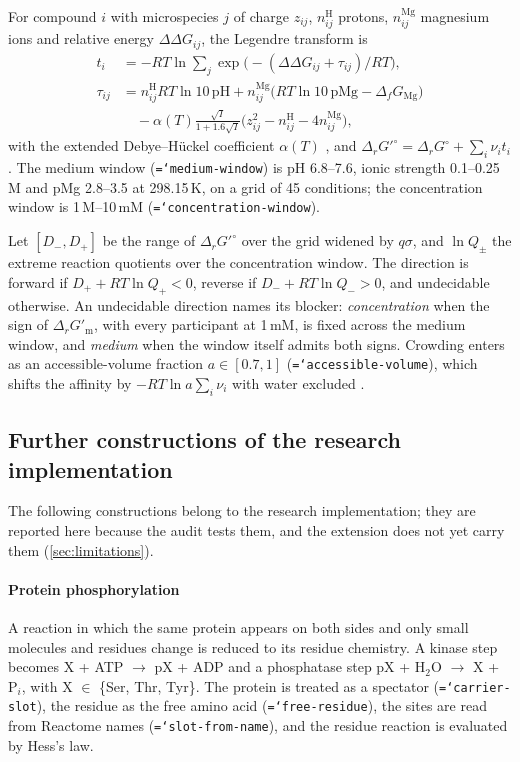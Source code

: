 \documentclass[5p]{elsarticle}
\theoremstyle{definition}
\theoremstyle{plain}
\newcommand{\DG}{\ensuremath{\Delta_r G^\circ}}
\newcommand{\DGp}{\ensuremath{\Delta_r G'^\circ}}
\newcommand{\DGm}{\ensuremath{\Delta_r G'_{\mathrm{m}}}}
\newcommand{\st}[1]{\textsf{#1}}            %
\newcommand{\breakingtt}[1]{\texttt{\hyphenchar\font=`\-\relax #1}}  %
\newcommand{\conv}[1]{\breakingtt{#1}}      %
\begin{document}
For compound $i$ with microspecies $j$ of charge $z_{ij}$, $n^{\mathrm H}_{ij}$ protons, $n^{\mathrm{Mg}}_{ij}$ magnesium ions and relative energy $\Delta\Delta G_{ij}$, the Legendre transform is
\begin{align}
  t_i&=-RT\ln\textstyle\sum_j\exp\bigl(-(\Delta\Delta G_{ij}+\tau_{ij})/RT\bigr),\\
  \tau_{ij}&=n^{\mathrm H}_{ij}RT\ln10\,\mathrm{pH}+n^{\mathrm{Mg}}_{ij}\bigl(RT\ln10\,\mathrm{pMg}-\Delta_fG_{\mathrm{Mg}}\bigr)\nonumber\\
  &\quad-\alpha(T)\tfrac{\sqrt I}{1+1.6\sqrt I}\bigl(z_{ij}^2-n^{\mathrm H}_{ij}-4n^{\mathrm{Mg}}_{ij}\bigr),
\end{align}
with the extended Debye--H\"uckel coefficient $\alpha(T)$ \citep{alberty2003thermodynamics,beber2022equilibrator}, and $\DGp=\DG+\sum_i\nu_it_i$.
The medium window (\conv{medium-window}) is pH 6.8--7.6, ionic strength 0.1--0.25\,M and pMg 2.8--3.5 at 298.15\,K, on a grid of 45 conditions; the concentration window is 1\,\textmu M--10\,mM (\conv{concentration-window}).

Let $[D_-,D_+]$ be the range of $\DGp$ over the grid widened by $q\sigma$, and $\ln Q_\pm$ the extreme reaction quotients over the concentration window.
The direction is forward if $D_++RT\ln Q_+<0$, reverse if $D_-+RT\ln Q_->0$, and \st{undecidable} otherwise.
An undecidable direction names its blocker: \emph{concentration} when the sign of $\DGm$, with every participant at 1\,mM, is fixed across the medium window, and \emph{medium} when the window itself admits both signs.
Crowding enters as an accessible-volume fraction $a\in[0.7,1]$ (\conv{accessible-volume}), which shifts the affinity by $-RT\ln a\sum_i\nu_i$ with water excluded \citep{minton2001crowding,zhou2008crowding}.

\subsection{Further constructions of the research implementation}
\label{sec:further}

The following constructions belong to the research implementation; they are reported here because the audit tests them, and the extension does not yet carry them (\cref{sec:limitations}).

\paragraph{Protein phosphorylation}
A reaction in which the same protein appears on both sides and only small molecules and residues change is reduced to its residue chemistry.
A kinase step becomes X + ATP $\to$ pX + ADP and a phosphatase step pX + H$_2$O $\to$ X + P$_i$, with X $\in$ \{Ser, Thr, Tyr\}.
The protein is treated as a spectator (\conv{carrier-slot}), the residue as the free amino acid (\conv{free-residue}), the sites are read from Reactome names (\conv{slot-from-name}), and the residue reaction is evaluated by Hess's law.
\end{document}
